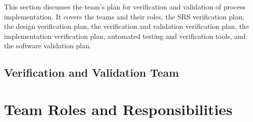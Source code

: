 \documentclass[12pt, titlepage]{article}
\begin{document}
This section discusses the team's plan for verification and validation of process implementation. It covers the teams and their roles, the SRS verification plan, the design verification plan, the verification and validation verification plan, the implementation verification plan, automated testing and verification tools, and the software validation plan. 

\subsection{Verification and Validation Team}

\section{Team Roles and Responsibilities}
\end{document}
